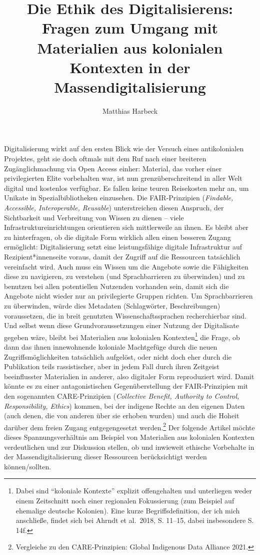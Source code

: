\documentclass[a4paper,
fontsize=11pt,
oneside,
numbers=noperiodatend,
parskip=half-,
bibliography=totoc,
final
]{scrartcl}
\title{\LARGE{Die Ethik des Digitalisierens: Fragen zum Umgang mit Materialien aus kolonialen Kontexten in der Massendigitalisierung}}%
\author{Matthias Harbeck} %
\date{}
\begin{document}
\maketitle
\thispagestyle{fancyplain} 


Digitalisierung wirkt auf den ersten Blick wie der Versuch eines
antikolonialen Projektes, geht sie doch oftmals mit dem Ruf nach einer
breiteren Zugänglichmachung via Open Access einher: Material, das vorher
einer privilegierten Elite vorbehalten war, ist nun grenzüberschreitend
in aller Welt digital und kostenlos verfügbar. Es fallen keine teuren
Reisekosten mehr an, um Unikate in Spezialbibliotheken einzusehen. Die
FAIR-Prinzipien (\emph{Findable, Accessible, Interoperable, Reusable})
unterstreichen diesen Anspruch, der Sichtbarkeit und Verbreitung von
Wissen zu dienen -- viele Infrastruktureinrichtungen orientieren sich
mittlerweile an ihnen. Es bleibt aber zu hinterfragen, ob die digitale
Form wirklich allen einen besseren Zugang ermöglicht: Digitalisierung
setzt eine leistungsfähige digitale Infrastruktur auf
Rezipient*innenseite voraus, damit der Zugriff auf die Ressourcen
tatsächlich vereinfacht wird. Auch muss ein Wissen um die Angebote sowie
die Fähigkeiten diese zu navigieren, zu verstehen (und Sprachbarrieren
zu überwinden) und zu benutzen bei allen potentiellen Nutzenden
vorhanden sein, damit sich die Angebote nicht wieder nur an
privilegierte Gruppen richten. Um Sprachbarrieren zu überwinden, würde
dies Metadaten (Schlagwörter, Beschreibungen) voraussetzen, die in breit
genutzten Wissenschaftssprachen recherchierbar sind. Und selbst wenn
diese Grundvoraussetzungen einer Nutzung der Digitalisate gegeben wäre,
bleibt bei Materialien aus kolonialen Kontexten\footnote{Dabei sind
  \enquote{koloniale Kontexte} explizit offengehalten und unterliegen
  weder einem Zeitschnitt noch einer regionalen Fokussierung (zum
  Beispiel auf ehemalige deutsche Kolonien). Eine kurze
  Begriffsdefinition, der ich mich anschließe, findet sich bei Ahrndt et
  al.~2018, S. 11--15, dabei insbesondere S. 14f.} die Frage, ob dann
das ihnen innewohnende koloniale Machtgefüge durch die neuen
Zugriffsmöglichkeiten tatsächlich aufgelöst, oder nicht doch eher durch
die Publikation teils rassistischer, aber in jedem Fall durch ihren
Zeitgeist beeinflusster Materialien in anderer, also digitaler Form
reproduziert wird. Damit könnte es zu einer antagonistischen
Gegenüberstellung der FAIR-Prinzipien mit den sogenannten
CARE-Prinzipien (\emph{Collective Benefit, Authority to Control,
Responsibility, Ethics}) kommen, bei der indigene Rechte an den eigenen
Daten (auch denen, die von anderen über sie erhoben wurden) und auch die
Hoheit darüber dem freien Zugang entgegengesetzt werden.\footnote{Vergleiche
  zu den CARE-Prinzipien: Global Indigenous Data Alliance 2021.} Der
folgende Artikel möchte dieses Spannungsverhältnis am Beispiel von
Materialien aus kolonialen Kontexten verdeutlichen und zur Diskussion
stellen, ob und inwieweit ethische Vorbehalte in der
Massendigitalisierung dieser Ressourcen berücksichtigt werden
können/sollten.
\end{document}
